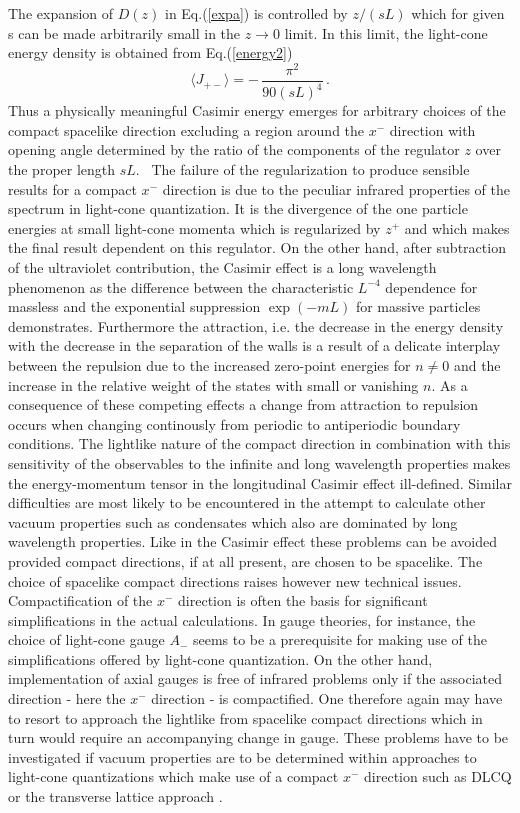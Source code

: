 \documentclass[a4paper,twocolumn,eqsecnum,aps]{revtex4}
\begin{document}
The expansion of $D(z)$ in Eq.(\ref{expa}) is controlled by  $z/(sL)$ which for given s can be made arbitrarily small in the $z \rightarrow 0$ limit. In this limit,   
the light-cone energy density is obtained from Eq.(\ref{energy2})
$$ \langle J_{+-}\rangle = - \,\frac{\pi^2}{90 (sL)^4}\, .$$
Thus a physically meaningful  Casimir energy emerges for arbitrary choices of the compact spacelike direction excluding  a  region around the $x^{-}$ direction with opening angle determined by the ratio of the components of the regulator $z$ over the proper length $sL$. 
\vskip 0.2cm
\,  The failure   
 of the regularization to produce sensible results for a compact $x^{-}$ direction is  due to the peculiar infrared properties of the spectrum in light-cone quantization.  It is the divergence of the one particle energies at small light-cone momenta which is regularized by $z^{+}$ and which makes the final result dependent on this regulator. On the other hand, after subtraction of the ultra\-violet contribution, the Casimir effect is a long wavelength phenomenon as the difference  between  the characteristic $L^{-4}$ dependence  for massless and the exponential suppression $\exp{(-mL)}$ for massive particles demonstrates. Furthermore the attraction, i.e. the decrease in the energy density with the decrease in the separation of the walls is a result of  a delicate interplay between the repulsion due to the increased zero-point energies for $n\neq 0$  and the increase in the relative weight of the states with small or vanishing $n$. As a consequence of these compe\-ting effects a change from attraction to repulsion occurs when chan\-ging continously from periodic to antiperiodic boundary conditions. The lightlike nature of the compact direction in combination with this sensitivity of the observables to the infinite and long wavelength properties makes the energy-momentum tensor in the longitudinal Casimir effect ill-defined. Similar difficulties are most likely to be encountered in the attempt to calculate other vacuum properties such as condensates which also are dominated by long wavelength properties.  Like in the Casimir effect these problems can be avoided provided  compact directions, if at all present, are chosen to be spacelike. The choice of  spacelike compact directions raises however  new technical issues.  Compactification of the $x^{-}$ direction is often the basis for significant simplifications in the actual calculations. In gauge theories, for instance,  the choice of light-cone gauge $A_{-}$ seems to be a prerequisite for making use of the simplifications offered by light-cone quantization. On the other hand, implementation of axial gauges is free of infrared problems only if the associated direction - here the $x^{-}$ direction - is compac\-tified. One therefore again may have to resort to approach the lightlike from spacelike compact directions which in turn would require an accompanying change in gauge. These problems have to be investigated  if va\-cuum properties are to be determined within approaches to light-cone quantizations which make use of a compact $x^{-}$ direction such as  DLCQ \cite{pauli1,pauli2,pauli3,pauli4} or the transverse lattice approach \cite{bardeen,burkardt,dalley,sande}.   
\end{document}
